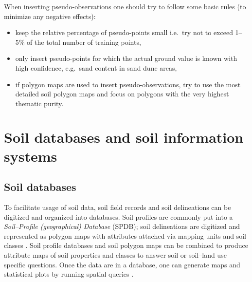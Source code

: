 \documentclass[11pt]{krantz}
\theoremstyle{definition}
\theoremstyle{definition}
\theoremstyle{definition}
\theoremstyle{remark}
\begin{document}
When inserting pseudo-observations one should try to follow some basic
rules (to minimize any negative effects):

\begin{itemize}
\item
  keep the relative percentage of pseudo-points small i.e.~try not to
  exceed 1--5\% of the total number of training points,
\item
  only insert pseudo-points for which the actual ground value is known
  with high confidence, e.g.~sand content in sand dune areas,
\item
  if polygon maps are used to insert pseudo-observations, try to use the
  most detailed soil polygon maps and focus on polygons with the very
  highest thematic purity.
\end{itemize}

\hypertarget{soil-databases}{%
\section{Soil databases and soil information
systems}\label{soil-databases}}

\hypertarget{soil-databases-1}{%
\subsection{Soil databases}\label{soil-databases-1}}

To facilitate usage of soil data, soil field records and soil
delineations can be digitized and organized into databases. Soil
profiles are commonly put into a \emph{Soil--Profile (geographical)
Database} (SPDB); soil delineations are digitized and represented as
polygon maps with attributes attached via mapping units and soil classes
\citep{Rossiter2004SUM}. Soil profile databases and soil polygon maps
can be combined to produce attribute maps of soil properties and classes
to answer soil or soil--land use specific questions. Once the data are
in a database, one can generate maps and statistical plots by running
spatial queries \citep{Beaudette2009CG}.
\end{document}
